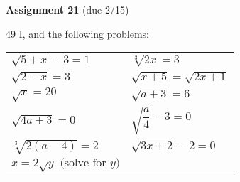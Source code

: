 \documentclass[12pt]{letter}
\newcounter{tci}
\newcommand{\tcialpha}{%
	\stepcounter{tci}%
	(\alph{tci})%
}
\newenvironment{twocolitems}
{
\setcounter{tci}{0}
\renewcommand{\arraystretch}{1.2}
\begin{tabular}{>{\makebox[0.5in]{\tcialpha}$}l<{$}>{\hspace*{0.2in}\makebox[0.5in]{\tcialpha}$}l<{$}}
}
{
\end{tabular}
}
\begin{document}
\textbf{Assignment 21} (due 2/15)


49 I, and the following problems:

\begin{twocolitems}
	\sqrt{5+x}-3=1&
	\sqrt[3]{2x}=3\\
	\sqrt{2-x}=3&
	\sqrt{x+5}=\sqrt{2x+1}\\
	\sqrt{x}=20&
	\sqrt{a+3}=6\\
	\sqrt{4a+3}=0&
	\sqrt{\dfrac a4}-3=0\\
	\sqrt[3]{2(a-4)}=2&
	\sqrt{3x+2}-2=0\\
	x=2\sqrt y\text{ (solve for $y$)}
\end{twocolitems}
\end{document}
